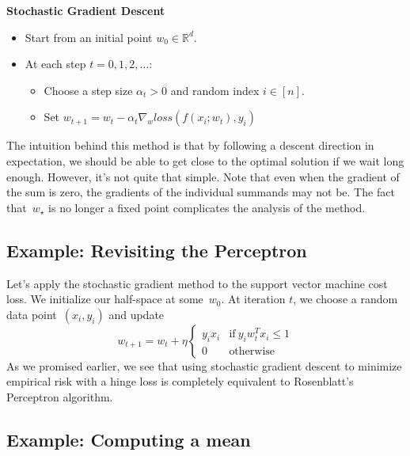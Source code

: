\documentclass{tufte-book}
\begin{document}
\begin{Algorithm}

\textbf{Stochastic Gradient Descent}

\begin{itemize}
\tightlist
\item
  Start from an initial point \(w_0 \in \mathbb{R}^d\).
\item
  At each step \(t=0,1,2,\dots\):

  \begin{itemize}
  \tightlist
  \item
    Choose a step size \(\alpha_t>0\) and random index \(i \in [n]\).
  \item
    Set
    \(w_{t+1} = w_t - \alpha_t \nabla_w \mathit{loss}(f(x_i;w_t),y_i)\)
  \end{itemize}
\end{itemize}

\end{Algorithm}

The intuition behind this method is that by following a descent
direction in expectation, we should be able to get close to the optimal
solution if we wait long enough. However, it's not quite that simple.
Note that even when the gradient of the sum is zero, the gradients of
the individual summands may not be. The fact that~\(w_\star\) is no
longer a fixed point complicates the analysis of the method.

\hypertarget{example-revisiting-the-perceptron}{%
\subsection{Example: Revisiting the
Perceptron}\label{example-revisiting-the-perceptron}}

Let's apply the stochastic gradient method to the support vector machine
cost loss. We initialize our half-space at some~\(w_{0}\). At iteration
\(t\), we choose a random data point~\((x_{i},y_{i})\) and update \[
w_{t+1}= w_{t}+\eta\begin{cases}
y_{i}x_{i} &\text{if}~y_{i}w_{t}^{T}x_{i}\leq 1\\
0 & \text{otherwise}
\end{cases}
\] As we promised earlier, we see that using stochastic gradient descent
to minimize empirical risk with a hinge loss is completely equivalent to
Rosenblatt's Perceptron algorithm.

\hypertarget{example-computing-a-mean}{%
\subsection{Example: Computing a mean}\label{example-computing-a-mean}}
\end{document}
